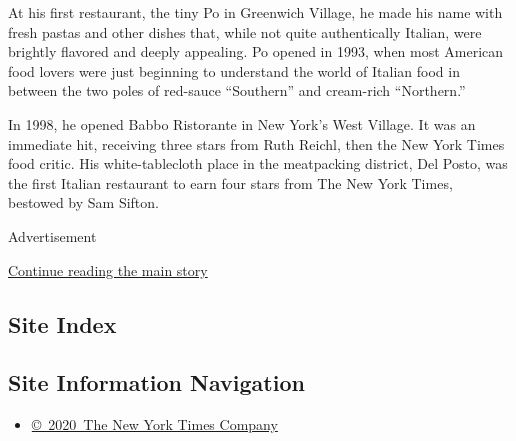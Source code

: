 At his first restaurant, the tiny Po in Greenwich Village, he made his
name with fresh pastas and other dishes that, while not quite
authentically Italian, were brightly flavored and deeply appealing. Po
opened in 1993, when most American food lovers were just beginning to
understand the world of Italian food in between the two poles of
red-sauce ``Southern'' and cream-rich ``Northern.''

In 1998, he opened Babbo Ristorante in New York's West Village. It was
an immediate hit, receiving three stars from Ruth Reichl, then the New
York Times food critic. His white-tablecloth place in the meatpacking
district, Del Posto, was the first Italian restaurant to earn four stars
from The New York Times, bestowed by Sam Sifton.

Advertisement

\protect\hyperlink{after-bottom}{Continue reading the main story}

\hypertarget{site-index}{%
\subsection{Site Index}\label{site-index}}

\hypertarget{site-information-navigation}{%
\subsection{Site Information
Navigation}\label{site-information-navigation}}

\begin{itemize}
\tightlist
\item
  \href{https://help.nytimes3xbfgragh.onion/hc/en-us/articles/115014792127-Copyright-notice}{©~2020~The
  New York Times Company}
\end{itemize}

